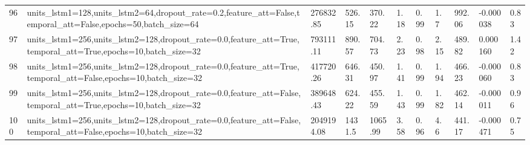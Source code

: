 \begin{longtable}{C{0.8cm} L{2cm} C{1.15cm} C{1.15cm} C{1.15cm} C{1.15cm} C{0.85cm} C{1.25cm} C{1.2cm} C{1.5cm} C{1.0cm}}
96 & units\_lstm1=128,\newline units\_lstm2=64,\newline dropout\_rate=0.2,\newline feature\_att=False,\newline temporal\_att=False,\newline epochs=50,\newline batch\_size=64 & 276832.85 & 526.15 & 370.22 & 1.18 & 0.99 & 1.7 & 992.06 & -0.000038 & 0.83 \\
97 & units\_lstm1=256,\newline units\_lstm2=128,\newline dropout\_rate=0.0,\newline feature\_att=True,\newline temporal\_att=True,\newline epochs=10,\newline batch\_size=32 & 793111.11 & 890.57 & 704.73 & 2.23 & 0.98 & 2.15 & 489.82 & 0.000160 & 1.42 \\
98 & units\_lstm1=256,\newline units\_lstm2=128,\newline dropout\_rate=0.0,\newline feature\_att=True,\newline temporal\_att=False,\newline epochs=10,\newline batch\_size=32 & 417720.26 & 646.31 & 450.97 & 1.41 & 0.99 & 1.94 & 466.23 & -0.000060 & 0.83 \\
99 & units\_lstm1=256,\newline units\_lstm2=128,\newline dropout\_rate=0.0,\newline feature\_att=False,\newline temporal\_att=True,\newline epochs=10,\newline batch\_size=32 & 389648.43 & 624.22 & 455.59 & 1.43 & 0.99 & 1.82 & 462.14 & -0.000011 & 0.96 \\
100 & units\_lstm1=256,\newline units\_lstm2=128,\newline dropout\_rate=0.0,\newline feature\_att=False,\newline temporal\_att=False,\newline epochs=10,\newline batch\_size=32 & 2049194.08 & 1431.5 & 1065.99 & 3.58 & 0.96 & 4.6 & 441.17 & -0.000471 & 0.75 \\

\end{longtable}
